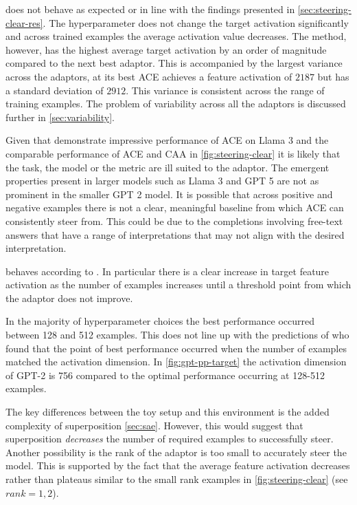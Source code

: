  does not behave as expected or in line with the findings presented in \cref{sec:steering-clear-res}.
The hyperparameter does not change the target activation significantly and across trained examples the average activation value decreases.
The method, however, has the highest average target activation by an order of magnitude compared to the next best adaptor.
This is accompanied by the largest variance across the adaptors, at its best ACE achieves a feature activation of $2187$ but has a standard deviation of $2912$.
This variance is consistent across the range of training examples.
The problem of variability across all the adaptors is discussed further in \cref{sec:variability}.

Given that \citet{ace} demonstrate impressive performance of ACE on Llama 3 \citep{llama3} and the comparable performance of ACE and CAA in \cref{fig:steering-clear} it is likely that the task, the model or the metric are ill suited to the adaptor.
The emergent properties present in larger models such as Llama 3 \citep{llama3} and GPT 5 \citep{gpt-5} are not as prominent in the smaller GPT 2 \citep{gpt-2} model.
It is possible that across positive and negative examples there is not a clear, meaningful baseline from which ACE can consistently steer from.
This could be due to the completions involving free-text answers that have a range of interpretations that may not align with the desired interpretation.

 behaves according to \citet{steering-clear}.
In particular there is a clear increase in target feature activation as the number of examples increases until a threshold point from which the adaptor does not improve.

In the majority of hyperparameter choices the best performance occurred between 128 and 512 examples.
This does not line up with the predictions of \citet{steering-clear} who found that the point of best performance occurred when the number of examples matched the activation dimension.
In \cref{fig:gpt-pp-target} the activation dimension of GPT-2 is 756 \citep{saelens} compared to the optimal performance occurring at 128-512 examples.

The key differences between the toy setup and this environment is the added complexity of superposition \cref{sec:sae}.
However, this would suggest that superposition \emph{decreases} the number of required examples to successfully steer.
Another possibility is the rank of the adaptor is too small to accurately steer the model.
This is supported by the fact that the average feature activation decreases rather than plateaus similar to the small rank examples in \cref{fig:steering-clear} (see $rank=1, 2$).

